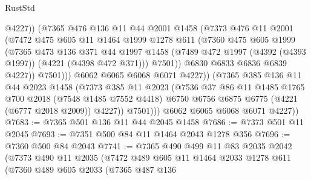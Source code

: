 \begin{lexlean}{RustStd}
\begin{coremodule}
{\begin{coremodule}
{{{{{{{{{{{{{{{{{{{{{{{{{{{{{{{                        @4227))
                    (@7365
                      @476
                      @136
                      @11
                      @44
                      @2001
                      @1458
                      (@7373
                        @476
                        @11
                        @2001
                        (@7472
                          @475
                          @605
                          @11
                          @1464
                          @1999
                          @1278
                          @611
                          (@7360
                            @475
                            @605
                            @1999
                            (@7365
                              @473
                              @136
                              @371
                              @44
                              @1997
                              @1458
                              (@7489 @472 @1997 (@4392 (@4393 @1997)) (@4221 (@4398 @472 @371)))
                              @7501))
                          @6830
                          @6833
                          @6836
                          @6839
                          @4227))
                      @7501)))
                @6062
                @6065
                @6068
                @6071
                @4227))
            (@7365
              @385
              @136
              @11
              @44
              @2023
              @1458
              (@7373
                @385
                @11
                @2023
                (@7536
                  @37
                  @86
                  @11
                  @1485
                  @1765
                  @700
                  @2018
                  (@7548 @1485 @7552 @4418)
                  @6750
                  @6756
                  @6875
                  @6775
                  (@4221 (@6777 @2018 @2009))
                  @4227))
              @7501)))
        @6062
        @6065
        @6068
        @6071
        @4227))
@7683 := @7365 @501 @136 @11 @44 @2045 @1458
@7686 := @7373 @501 @11 @2045
@7693 := @7351 @500 @84 @11 @1464 @2043 @1278 @356
@7696 := @7360 @500 @84 @2043
@7741 := @7365
    @490
    @499
    @11
    @83
    @2035
    @2042
    (@7373
      @490
      @11
      @2035
      (@7472
        @489
        @605
        @11
        @1464
        @2033
        @1278
        @611
        (@7360
          @489
          @605
          @2033
          (@7365
            @487
            @136
}}}}}}}}}}}}}}}}}}}}}}}}}}}}}}}
\end{coremodule}}
\end{coremodule}
\end{lexlean}
